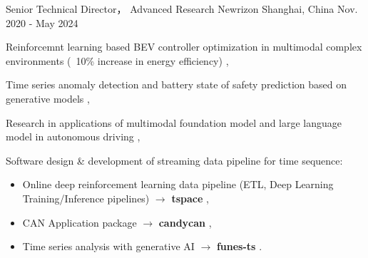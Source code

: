 \documentclass[../resume_xin.tex]{subfiles}
\begin{document}


\begin{cventries}

  \cventry
    {Senior Technical Director， Advanced Research} %
    {Newrizon} %
    {Shanghai, China} %
    {Nov. 2020 - May 2024} %
    {
      \begin{cvitems} %
          \item Reinforcemnt learning based BEV controller optimization in multimodal complex environments (~10\% increase in energy efficiency) \supercite{Xin_VEOS_22},
          \item Time series anomaly detection and battery state of safety prediction based on generative models \supercite{Xin_GenAI_23},
          \item Research in applications of multimodal foundation model and large language model in autonomous driving \supercite{Xin_VLM_24} \supercite{Xin_Latent_Diffusion_23},
          \item Software design \& development of streaming data pipeline for time sequence:
            \begin{itemize}
                    \item Online deep reinforcement learning data pipeline (ETL, Deep Learning Training/Inference pipelines) $\rightarrow$ \textbf{tspace} \href{https://binjian.github.io/tspace/}{\faGithub},
                    \item CAN Application package $\rightarrow$ \textbf{candycan} \href{https://binjian.github.io/candycan/}{\faGithub},
                    \item Time series analysis with generative AI $\rightarrow$ \textbf{funes-ts} \href{https://github.com/binjian/funes-ts/}{\faGithub}.
            \end{itemize}
      \end{cvitems}
    }


\end{cventries}
\end{document}
